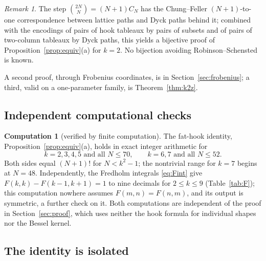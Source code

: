 \documentclass[11pt]{article}
\theoremstyle{definition}
\newtheorem{computation}[theorem]{Computation}
\theoremstyle{remark}
\newtheorem{remark}[theorem]{Remark}
\begin{document}
\begin{remark}
The step $\binom{2N}N=(N+1)C_N$ has the Chung--Feller $(N+1)$-to-one correspondence between lattice paths and Dyck paths behind it; combined with the encodings of pairs of hook tableaux by pairs of subsets and of pairs of two-column tableaux by Dyck paths, this yields a bijective proof of Proposition~\ref{prop:equiv}(a) for $k=2$. No bijection avoiding Robinson--Schensted is known.
\end{remark}

A second proof, through Frobenius coordinates, is in Section~\ref{sec:frobenius}; a third, valid on a one-parameter family, is Theorem~\ref{thm:k2z}.

\subsection{Independent computational checks}

\begin{computation}[verified by finite computation]\label{comp:main}
The fat-hook identity, Proposition~\ref{prop:equiv}(a), holds in exact integer arithmetic for
\[
k=2,3,4,5\text{ and all }N\le70,\qquad k=6,7\text{ and all }N\le52 .
\]
Both sides equal $(N+1)!$ for $N<k^2-1$; the nontrivial range for $k=7$ begins at $N=48$. Independently, the Fredholm integrals \eqref{eq:Fint} give $F(k,k)-F(k-1,k+1)=1$ to nine decimals for $2\le k\le9$ (Table~\ref{tab:F}); this computation nowhere assumes $F(m,n)=F(n,m)$, and its output is symmetric, a further check on it. Both computations are independent of the proof in Section~\ref{sec:proof}, which uses neither the hook formula for individual shapes nor the Bessel kernel.
\end{computation}

\subsection{The identity is isolated}
\end{document}
